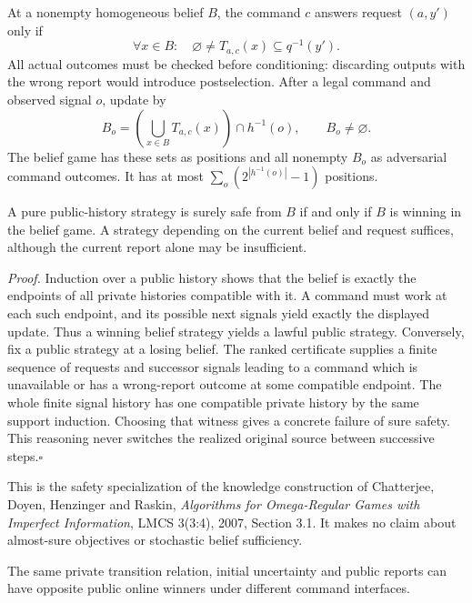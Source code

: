 At a nonempty homogeneous belief $B$, the command $c$ answers request $(a,y')$
only if
\[
 \forall x\in B:\quad
 \varnothing\ne T_{a,c}(x)\subseteq q^{-1}(y').
\]
All actual outcomes must be checked before conditioning: discarding outputs
with the wrong report would introduce postselection. After a legal command
and observed signal $o$, update by
\[
 B_o=\left(\bigcup_{x\in B}T_{a,c}(x)\right)\cap h^{-1}(o),
 \qquad B_o\ne\varnothing.
\]
The belief game has these sets as positions and all nonempty $B_o$ as
adversarial command outcomes. It has at most
$\sum_o(2^{|h^{-1}(o)|}-1)$ positions.

\begin{theorem}
\label{online-public-safety}
A pure public-history strategy is surely safe from $B$ if and only if $B$ is
winning in the belief game. A strategy depending on the current belief and
request suffices, although the current report alone may be insufficient.
\end{theorem}

\emph{Proof.}
Induction over a public history shows that the belief is exactly the endpoints
of all private histories compatible with it. A command must work at each such
endpoint, and its possible next signals yield exactly the displayed update.
Thus a winning belief strategy yields a lawful public strategy. Conversely,
fix a public strategy at a losing belief. The ranked certificate supplies a
finite sequence of requests and successor signals leading to a command which
is unavailable or has a wrong-report outcome at some compatible endpoint.
The whole finite signal history has one compatible private history by the
same support induction. Choosing that witness gives a concrete failure of
sure safety. This reasoning never switches the realized original source
between successive steps.\hfill$\square$

This is the safety specialization of the knowledge construction of Chatterjee,
Doyen, Henzinger and Raskin, \emph{Algorithms for Omega-Regular Games with
Imperfect Information}, LMCS 3(3:4), 2007, Section 3.1. It makes no claim
about almost-sure objectives or stochastic belief sufficiency.

\begin{proposition}
\label{online-command-nonidentifiability}
The same private transition relation, initial uncertainty and public reports
can have opposite public online winners under different command interfaces.
\end{proposition}

